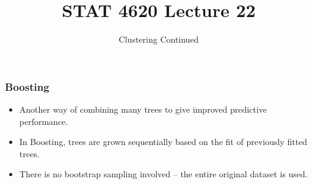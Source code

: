\documentclass{beamer}
\title[] %
{\LARGE\bf STAT 4620 Lecture 22}
\subtitle{Clustering Continued} %
\date[] %
{}
\begin{document}
\titlepage

\begin{frame}
\frametitle{Boosting}

\begin{itemize}
\item Another way of combining many trees to give improved predictive performance.
\item In Boosting, trees are grown sequentially based on the fit of previously fitted trees.
\item There is no bootstrap sampling involved -- the entire original dataset is used.
\end{itemize}

\end{frame}
\end{document}
